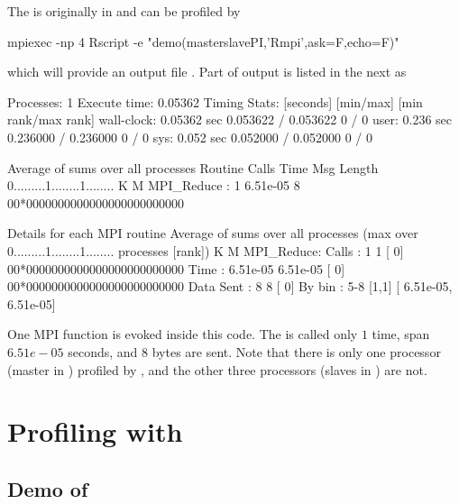 The  is originally in  and can be
profiled by
\begin{Code}
mpiexec -np 4 Rscript -e "demo(masterslavePI,'Rmpi',ask=F,echo=F)"
\end{Code}
which will provide an output file .
Part of output is listed in the next as
\begin{Output}
Processes:	1
Execute time:	0.05362
Timing Stats: [seconds]	[min/max]    	[min rank/max rank]
wall-clock: 0.05362 sec	0.053622 / 0.053622	0 / 0
user: 0.236 sec	0.236000 / 0.236000	0 / 0
sys: 0.052 sec	0.052000 / 0.052000	0 / 0

Average of sums over all processes
Routine                 Calls       Time Msg Length    %
0.........1........1........
K        M
MPI_Reduce          :       1   6.51e-05          8 00*0000000000000000000000000

Details for each MPI routine
Average of sums over all processes
(max over          0.........1........1........
 processes [rank])           K        M
MPI_Reduce:
  Calls     :          1            1 [   0] 00*0000000000000000000000000
Time      :   6.51e-05     6.51e-05 [   0] 00*0000000000000000000000000
Data Sent :          8            8 [   0]
By bin    : 5-8	[1,1]	[  6.51e-05,  6.51e-05]
\end{Output}
One MPI  function  is
evoked inside this  code. The  is called only $1$
  time, span $6.51e-05$ seconds, and 8 bytes are sent.
Note that there is only one processor (master in )
profiled by , and the other three processors
(slaves in ) are not.



\section{Profiling with }
\label{sec:ex_mpiP}

\subsection{Demo of }

